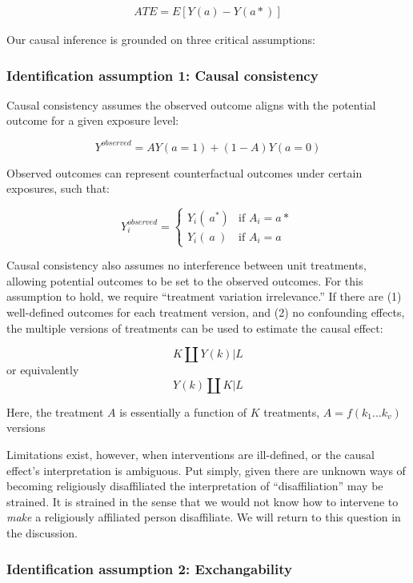 \documentclass[
  singlecolumn]{report}
\begin{document}
   \begin{align*}
    ATE = E[Y(a) - Y(a*)]
    \end{align*}

Our causal inference is grounded on three critical assumptions:

\hypertarget{identification-assumption-1-causal-consistency}{%
\subsubsection{Identification assumption 1: Causal
consistency}\label{identification-assumption-1-causal-consistency}}

Causal consistency assumes the observed outcome aligns with the
potential outcome for a given exposure level:

\[Y^{observed} = AY(a=1) + (1-A)Y(a=0)\]

Observed outcomes can represent counterfactual outcomes under certain
exposures, such that:

\[
Y^{observed}_i = 
\begin{cases} 
Y_i(~a^*) & \text{if } A_i = a* \\
Y_i(~a~) & \text{if } A_i = a
\end{cases}
\]

Causal consistency also assumes no interference between unit treatments,
allowing potential outcomes to be set to the observed outcomes. For this
assumption to hold, we require ``treatment variation irrelevance.'' If
there are (1) well-defined outcomes for each treatment version, and (2)
no confounding effects, the multiple versions of treatments can be used
to estimate the causal effect:

\[K \coprod Y(k) | L\] or equivalently \[Y(k) \coprod K | L\]

Here, the treatment \(A\) is essentially a function of \(K\) treatments,
\(A = f(k_1...k_v)\) versions

Limitations exist, however, when interventions are ill-defined, or the
causal effect's interpretation is ambiguous. Put simply, given there are
unknown ways of becoming religiously disaffiliated the interpretation of
``disaffiliation'' may be strained. It is strained in the sense that we
would not know how to intervene to \emph{make} a religiously affiliated
person disaffiliate. We will return to this question in the discussion.

\hypertarget{identification-assumption-2-exchangability}{%
\subsubsection{Identification assumption 2:
Exchangability}\label{identification-assumption-2-exchangability}}
\end{document}
